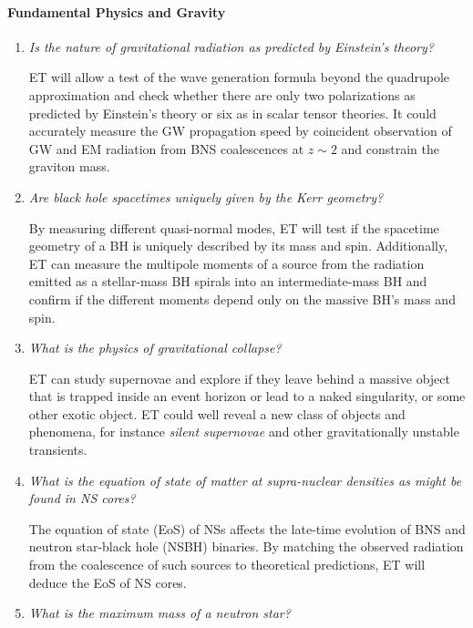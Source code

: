 \paragraph {\bf Fundamental Physics and Gravity}
\begin{enumerate}
\item {\em Is the nature of gravitational radiation as predicted by 
Einstein's theory? }

ET will allow a test of the wave generation formula beyond the quadrupole 
approximation and check whether 
there are only two polarizations as predicted by Einstein's theory or six as 
in scalar tensor theories. It could accurately measure the GW propagation 
speed by coincident observation of GW and EM radiation from BNS
coalescences at $z\sim 2$ and constrain the graviton mass.

\item {\em Are black hole spacetimes uniquely given by the Kerr geometry?}

By measuring different quasi-normal modes, ET will test if 
the spacetime geometry of a BH is uniquely described by its mass and spin.
Additionally, ET can measure the multipole moments of a source from the 
radiation emitted as a stellar-mass BH spirals into an 
intermediate-mass BH and confirm if the different moments 
depend only on the massive BH's mass and spin.

\item {\em What is the physics of gravitational collapse?}

ET can study supernovae and explore if they leave behind a massive 
object that is trapped inside an event horizon or lead to a naked 
singularity, or some other exotic object. ET could well reveal a new 
class of objects and phenomena, for instance \emph{silent supernovae} 
\cite{Woosley:1992} and other gravitationally unstable transients.

\item {\em What is the equation of state of matter at 
supra-nuclear densities as might be found in NS cores?}

The equation of state (EoS) of NSs affects the late-time evolution of 
BNS and neutron star-black hole (NSBH) binaries. By matching the observed 
radiation from the coalescence of such sources to theoretical predictions, ET will 
deduce the EoS of NS cores.

\item {\em What is the maximum mass of a neutron star?}


\end{enumerate}
